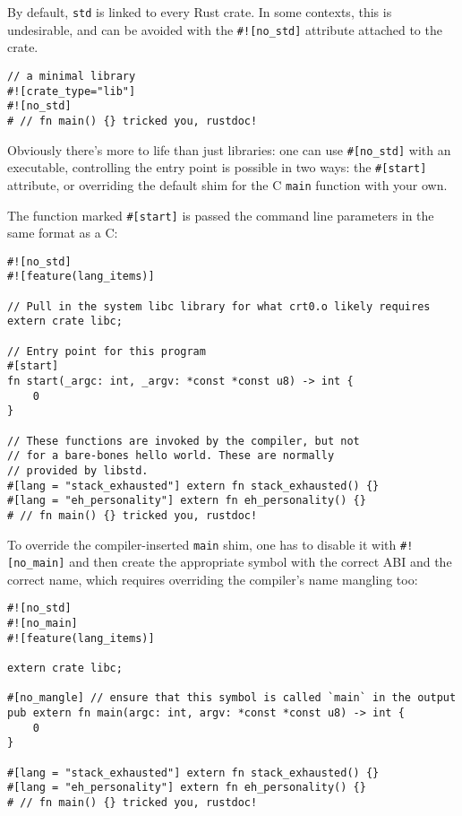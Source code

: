 \documentclass[]{article}
\begin{document}
By default, \texttt{std} is linked to every Rust crate. In some
contexts, this is undesirable, and can be avoided with the
\texttt{\#!{[}no\_std{]}} attribute attached to the crate.

\begin{verbatim}
// a minimal library
#![crate_type="lib"]
#![no_std]
# // fn main() {} tricked you, rustdoc!
\end{verbatim}

Obviously there's more to life than just libraries: one can use
\texttt{\#{[}no\_std{]}} with an executable, controlling the entry point
is possible in two ways: the \texttt{\#{[}start{]}} attribute, or
overriding the default shim for the C \texttt{main} function with your
own.

The function marked \texttt{\#{[}start{]}} is passed the command line
parameters in the same format as a C:

\begin{verbatim}
#![no_std]
#![feature(lang_items)]

// Pull in the system libc library for what crt0.o likely requires
extern crate libc;

// Entry point for this program
#[start]
fn start(_argc: int, _argv: *const *const u8) -> int {
    0
}

// These functions are invoked by the compiler, but not
// for a bare-bones hello world. These are normally
// provided by libstd.
#[lang = "stack_exhausted"] extern fn stack_exhausted() {}
#[lang = "eh_personality"] extern fn eh_personality() {}
# // fn main() {} tricked you, rustdoc!
\end{verbatim}

To override the compiler-inserted \texttt{main} shim, one has to disable
it with \texttt{\#!{[}no\_main{]}} and then create the appropriate
symbol with the correct ABI and the correct name, which requires
overriding the compiler's name mangling too:

\begin{verbatim}
#![no_std]
#![no_main]
#![feature(lang_items)]

extern crate libc;

#[no_mangle] // ensure that this symbol is called `main` in the output
pub extern fn main(argc: int, argv: *const *const u8) -> int {
    0
}

#[lang = "stack_exhausted"] extern fn stack_exhausted() {}
#[lang = "eh_personality"] extern fn eh_personality() {}
# // fn main() {} tricked you, rustdoc!
\end{verbatim}
\end{document}
